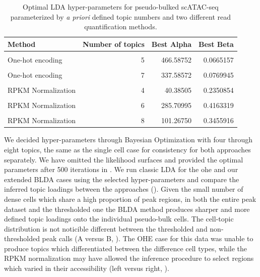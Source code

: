 \begin{table}
  \centering
  \begin{tabular}[t]{lrrr}
  \toprule
  Method & Number of topics & Best Alpha & Best Beta\\
  \midrule
  \cellcolor{gray!6}{One-hot encoding} & \cellcolor{gray!6}{4} & \cellcolor{gray!6}{123.68822} & \cellcolor{gray!6}{0.0382351}\\
  One-hot encoding & 5 & 466.58752 & 0.0665157\\
  \cellcolor{gray!6}{One-hot encoding} & \cellcolor{gray!6}{6} & \cellcolor{gray!6}{450.96735} & \cellcolor{gray!6}{0.0756824}\\
  One-hot encoding & 7 & 337.58572 & 0.0769945\\
  \cellcolor{gray!6}{One-hot encoding} & \cellcolor{gray!6}{8} & \cellcolor{gray!6}{100.35205} & \cellcolor{gray!6}{0.0872716}\\
  \addlinespace
  RPKM Normalization & 4 & 40.38505 & 0.2350854\\
  \cellcolor{gray!6}{RPKM Normalization} & \cellcolor{gray!6}{5} & \cellcolor{gray!6}{285.51986} & \cellcolor{gray!6}{0.3011584}\\
  RPKM Normalization & 6 & 285.70995 & 0.4163319\\
  \cellcolor{gray!6}{RPKM Normalization} & \cellcolor{gray!6}{7} & \cellcolor{gray!6}{366.02309} & \cellcolor{gray!6}{0.3825605}\\
  RPKM Normalization & 8 & 101.26750 & 0.3455916\\
  \bottomrule
  \end{tabular}
  \caption{Optimal LDA hyper-parameters for pseudo-bulked scATAC-seq parameterized by \textit{a priori} defined topic numbers and two different read quantification methods.}
  \label{table:pb_opt_params}
\end{table}

We decided hyper-parameters through Bayesian Optimization with four through eight topics, the same as the single cell case for consistency for both approaches separately. We have omitted the likelihood surfaces and provided the optimal parameters after 500 iterations in . We run classic LDA for the \gls{ohe} and our extended BLDA cases using the selected hyper-parameters and compare the inferred topic loadings between the approaches (). Given the small number of dense cells which share a high proportion of peak regions, in both the entire peak dataset and the thresholded one the BLDA method produces sharper and more defined topic loadings onto the individual pseudo-bulk cells. The cell-topic distribution is not noticible different between the thresholded and non-thresholded peak calls (A versus B, ).
The OHE case for this data was unable to produce topics which differentiated between the difference cell types, while the RPKM normalization may have allowed the inference procedure to select regions which varied in their accessibility (left versus right, ). 

